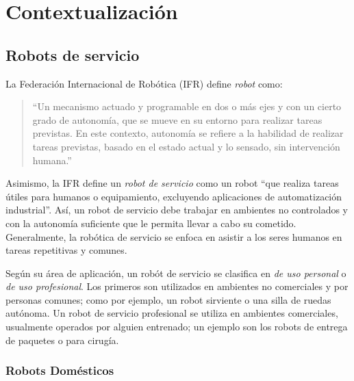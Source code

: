 
\chapter{Contextualizaci\'on}



\section{Robots de servicio}

La Federaci\'on Internacional de Rob\'otica (IFR)\cite{IFR} define \textit{robot} como:
\begin{quotation}
``Un mecanismo actuado y programable en dos o m\'as ejes y con un cierto grado de autonom\'ia, que se mueve en su entorno para realizar tareas previstas. En este contexto, autonom\'ia se refiere a la habilidad de realizar tareas previstas, basado en el estado actual y lo sensado, sin intervenci\'on humana.''
\end{quotation}

Asimismo, la IFR define un \textit{robot de servicio} como un robot ``que realiza tareas \'utiles para humanos o equipamiento, excluyendo aplicaciones de automatizaci\'on industrial''. As\'i, un robot de servicio debe trabajar en ambientes no controlados y con la autonom\'ia suficiente que le permita llevar a cabo su cometido. Generalmente, la rob\'otica de servicio se enfoca en asistir a los seres humanos en tareas repetitivas y comunes.

Seg\'un su \'area de aplicaci\'on, un rob\'ot de servicio se clasifica en \textit{de uso personal} o \textit{de uso profesional}. Los primeros son utilizados en ambientes no comerciales y por personas comunes; como por ejemplo, un robot sirviente o una silla de ruedas aut\'onoma. Un robot de servicio profesional se utiliza en ambientes comerciales, usualmente operados por alguien entrenado; un ejemplo son los robots de entrega de paquetes o para cirug\'ia.


\subsection{Robots Dom\'esticos}

